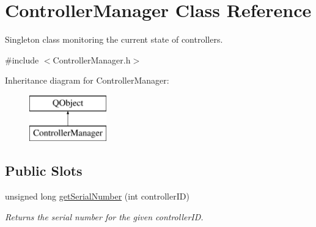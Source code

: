 \hypertarget{class_controller_manager}{}\section{Controller\+Manager Class Reference}
\label{class_controller_manager}


Singleton class monitoring the current state of controllers.  




{\ttfamily \#include $<$Controller\+Manager.\+h$>$}

Inheritance diagram for Controller\+Manager\+:\begin{figure}[H]
\begin{center}
\leavevmode
\includegraphics[height=2.000000cm]{class_controller_manager}
\end{center}
\end{figure}
\subsection*{Public Slots}
\begin{DoxyCompactItemize}
\item 
\mbox{\label{class_controller_manager_a5b496ff2650f4048dc91de9cdeea43c8}} 
unsigned long \hyperlink{class_controller_manager_a5b496ff2650f4048dc91de9cdeea43c8}{get\+Serial\+Number} (int controller\+ID)
\begin{DoxyCompactList}\small\item\em Returns the serial number for the given controller\+ID. \end{DoxyCompactList}\end{DoxyCompactItemize}
